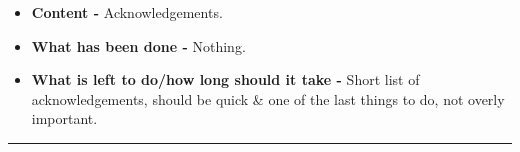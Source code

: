 \begin{itemize}
	\item \textbf{Content -} Acknowledgements.
	\item \textbf{What has been done -} Nothing.
	\item \textbf{What is left to do/how long should it take -} Short list of acknowledgements, should be quick \& one of the last things to do, not overly important.
\end{itemize}

\hrule